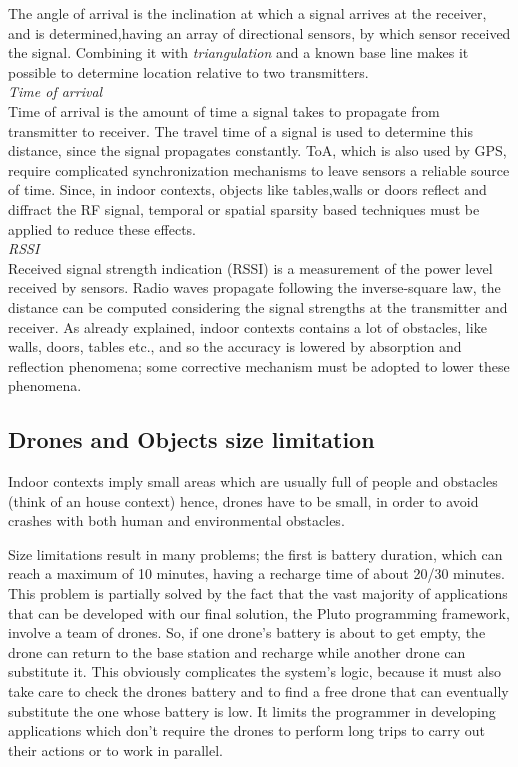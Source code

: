 The angle of arrival is the inclination at which a signal arrives at the receiver, and is determined,having an array of directional sensors, by which sensor received the signal.
Combining it with \textit{triangulation} and a known base line makes it possible to determine location relative to two transmitters.
\\

\textit{Time of arrival}
\\

Time of arrival is the amount of time a signal takes to propagate from transmitter to receiver. The travel time of a signal is used to determine this distance, since the signal propagates constantly.
ToA, which is also used by GPS, require complicated synchronization mechanisms to leave sensors a reliable source of time.
Since, in indoor contexts, objects like tables,walls or doors reflect and diffract the RF signal, temporal or spatial sparsity based techniques must be applied to reduce these effects.
\\

\textit{RSSI}
\\

Received signal strength indication (RSSI) is a measurement of the power level received by sensors.
Radio waves propagate following the inverse-square law, the distance can be computed considering the signal strengths at the transmitter and receiver.
As already explained, indoor contexts contains a lot of obstacles, like walls, doors, tables etc., and so the accuracy is lowered by absorption and reflection phenomena; some corrective mechanism must be adopted to lower these phenomena.

\newpage

\subsection{Drones and Objects size limitation}


Indoor contexts imply small areas which are usually full of people and obstacles (think of an house context) hence, drones have to be small, in order to avoid crashes with both human and environmental obstacles.

Size limitations result in many problems; the first is battery duration, which can reach a maximum of 10 minutes, having a recharge time of about 20/30 minutes.
This problem is partially solved by the fact that the vast majority of applications that can be developed with our final solution, the Pluto programming framework, involve a team of drones. 
So, if one drone's battery is about to get empty, the drone can return to the base station and recharge while another drone can substitute it.
This obviously complicates the system's logic, because it must also take care to check the drones battery and to find a free drone that can eventually substitute the one whose battery is low.
It limits the programmer in developing applications which don't require the drones to perform long trips to carry out their actions or to work in parallel.


